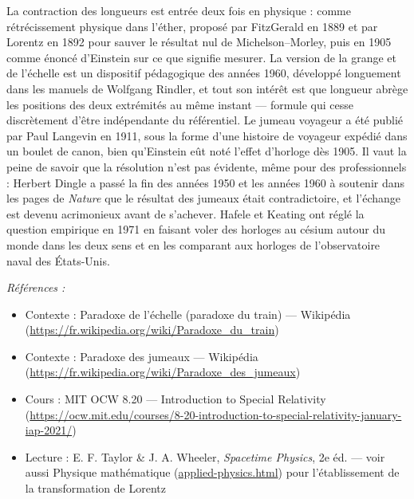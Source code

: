 \documentclass[11pt]{article}
\newenvironment{refs}{\par\small\noindent\emph{Références :}\begin{itemize}\setlength\itemsep{0pt}}{\end{itemize}\normalsize}
\begin{document}
\noindent La contraction des longueurs est entrée deux fois en physique : comme
rétrécissement physique dans l'éther, proposé par FitzGerald en 1889 et par Lorentz en 1892
pour sauver le résultat nul de Michelson--Morley, puis en 1905 comme énoncé d'Einstein sur ce
que signifie mesurer. La version de la grange et de l'échelle est un dispositif pédagogique
des années 1960, développé longuement dans les manuels de Wolfgang Rindler, et tout son
intérêt est que \og{} longueur \fg{} abrège \og{} les positions des deux extrémités au même instant \fg{} ---
formule qui cesse discrètement d'être indépendante du référentiel. Le jumeau voyageur a été
publié par Paul Langevin en 1911, sous la forme d'une histoire de voyageur expédié dans un
boulet de canon, bien qu'Einstein eût noté l'effet d'horloge dès 1905. Il vaut la peine de
savoir que la résolution n'est pas évidente, même pour des professionnels : Herbert Dingle a
passé la fin des années 1950 et les années 1960 à soutenir dans les pages de \textit{Nature}
que le résultat des jumeaux était contradictoire, et l'échange est devenu acrimonieux avant
de s'achever. Hafele et Keating ont réglé la question empirique en 1971 en faisant voler des
horloges au césium autour du monde dans les deux sens et en les comparant aux horloges de
l'observatoire naval des États-Unis.

\begin{refs}
\item Contexte : Paradoxe de l'échelle (paradoxe du train) --- Wikipédia (\url{https://fr.wikipedia.org/wiki/Paradoxe_du_train})
\item Contexte : Paradoxe des jumeaux --- Wikipédia (\url{https://fr.wikipedia.org/wiki/Paradoxe_des_jumeaux})
\item Cours : MIT OCW 8.20 --- Introduction to Special Relativity (\url{https://ocw.mit.edu/courses/8-20-introduction-to-special-relativity-january-iap-2021/})
\item Lecture : E. F. Taylor \& J. A. Wheeler, \textit{Spacetime Physics}, 2e éd. --- voir aussi Physique mathématique (\url{applied-physics.html}) pour l'établissement de la transformation de Lorentz
\end{refs}

\bigskip
\end{document}
